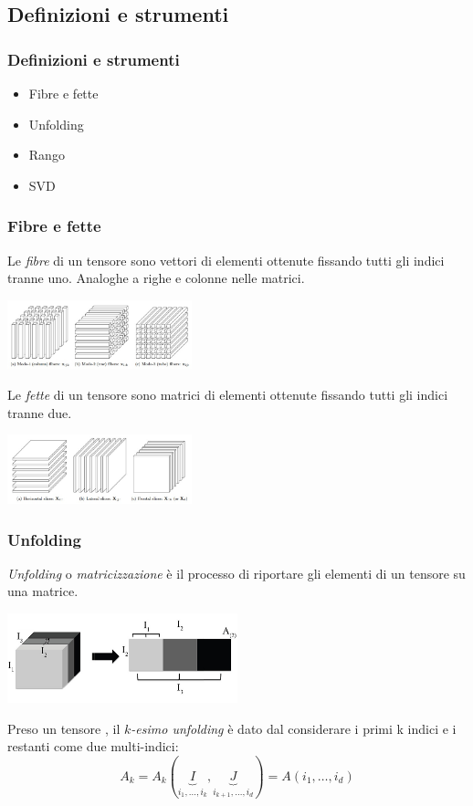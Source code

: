 \documentclass[compress]{beamer}
\theoremstyle{definition}
\theoremstyle{plain}
\begin{document}
\subsection{Definizioni e strumenti}
\begin{frame}
\frametitle{Definizioni e strumenti}
\begin{itemize}
\item Fibre e fette
\item Unfolding
\item Rango
\item SVD
\end{itemize}
\end{frame}

\begin{frame}
\frametitle{Fibre e fette}
Le \emph{fibre} di un tensore sono vettori di elementi ottenute fissando tutti gli indici tranne uno.
Analoghe a righe e colonne nelle matrici.

\begin{center}
	\includegraphics[width=0.4\textwidth]{Img/fibers.jpg}
\end{center}

\pause
Le \emph{fette} di un tensore sono matrici di elementi ottenute fissando tutti gli indici tranne due.

\begin{center}
	\includegraphics[width=0.4\textwidth]{Img/slices.jpg}
\end{center}
\end{frame}

\begin{frame}
\frametitle{Unfolding}
\emph{Unfolding} o \emph{matricizzazione} è il processo di riportare gli elementi di un tensore su una matrice.

\begin{center}
	\includegraphics[width=0.5\textwidth]{Img/unfolding.jpg}
\end{center}

\pause
Preso un tensore \A, il \emph{$k$-esimo unfolding} è dato dal considerare i primi k indici e i restanti come due multi-indici:
\begin{equation*}
	A_k = A_k(
	\underbrace{I}_{i_1,\dots,i_k}
	,
	\underbrace{J}_{i_{k+1},\dots,i_d}
	) = A(i_1,\dots,i_d)	
\end{equation*}
\end{frame}
\end{document}
